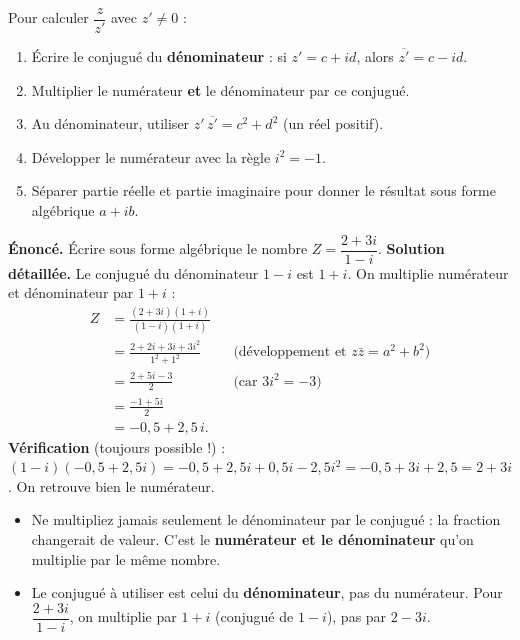 \documentclass[11pt]{article}
\begin{document}
\begin{methode}
Pour calculer $\dfrac{z}{z'}$ avec $z' \neq 0$ :
\begin{enumerate}
\item Écrire le conjugué du \textbf{dénominateur} : si $z' = c + id$, alors $\overline{z'} = c - id$.
\item Multiplier le numérateur \textbf{et} le dénominateur par ce conjugué.
\item Au dénominateur, utiliser $z'\,\overline{z'} = c^2 + d^2$ (un réel positif).
\item Développer le numérateur avec la règle $i^2 = -1$.
\item Séparer partie réelle et partie imaginaire pour donner le résultat sous forme algébrique $a + ib$.
\end{enumerate}
\end{methode}

\begin{exoresolu}
\textbf{Énoncé.} Écrire sous forme algébrique le nombre $Z = \dfrac{2+3i}{1-i}$.
\tcblower
\textbf{Solution détaillée.} Le conjugué du dénominateur $1-i$ est $1+i$. On multiplie numérateur et dénominateur par $1+i$ :
\begin{align*}
Z &= \frac{(2+3i)(1+i)}{(1-i)(1+i)}\\[4pt]
&= \frac{2 + 2i + 3i + 3i^2}{1^2 + 1^2} & &\text{(développement et } z\bar{z} = a^2+b^2\text{)}\\[4pt]
&= \frac{2 + 5i - 3}{2} & &\text{(car } 3i^2 = -3\text{)}\\[4pt]
&= \frac{-1 + 5i}{2}\\[4pt]
&= -0{,}5 + 2{,}5\,i.
\end{align*}
\textbf{Vérification} (toujours possible !) : $(1-i)(-0{,}5+2{,}5i) = -0{,}5 + 2{,}5i + 0{,}5i - 2{,}5i^2 = -0{,}5 + 3i + 2{,}5 = 2 + 3i$. On retrouve bien le numérateur.
\end{exoresolu}

\begin{attention}
\begin{itemize}
\item Ne multipliez jamais seulement le dénominateur par le conjugué : la fraction changerait de valeur. C'est le \textbf{numérateur et le dénominateur} qu'on multiplie par le même nombre.
\item Le conjugué à utiliser est celui du \textbf{dénominateur}, pas du numérateur. Pour $\dfrac{2+3i}{1-i}$, on multiplie par $1+i$ (conjugué de $1-i$), pas par $2-3i$.
\end{itemize}
\end{attention}
\end{document}
